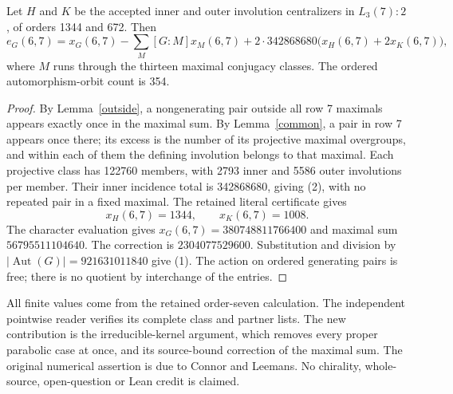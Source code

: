 \documentclass[11pt,a4paper]{article}
\begin{document}
\begin{theorem}
Let $H$ and $K$ be the accepted inner and outer involution centralizers
in $L_3(7):2$, of orders 1344 and 672. Then
\[
 e_G(6,7)=x_G(6,7)-\sum_M[G:M]x_M(6,7)
       +2\cdot342868680\bigl(x_H(6,7)+2x_K(6,7)\bigr),          \tag{2}
\]
where $M$ runs through the thirteen maximal conjugacy classes.
The ordered automorphism-orbit count is 354.
\end{theorem}
\begin{proof}
By Lemma~\ref{outside}, a nongenerating pair outside all row 7
maximals appears exactly once in the maximal sum. By
Lemma~\ref{common}, a pair in row 7 appears once there; its excess
is the number of its projective maximal overgroups, and within
each of them the defining involution belongs to that maximal.
Each projective class has 122760 members, with 2793 inner and
5586 outer involutions per member. Their inner incidence total is
342868680, giving (2), with no repeated pair in a fixed maximal.
The retained literal certificate gives
\[
                        x_H(6,7)=1344,\qquad x_K(6,7)=1008.
\]
The character evaluation gives $x_G(6,7)=380748811766400$ and
maximal sum $56795511104640$. The correction is $2304077529600$.
Substitution and division by $|\operatorname{Aut}(G)|=921631011840$
give (1). The action on ordered generating pairs is free; there
is no quotient by interchange of the entries.
\end{proof}

All finite values come from the retained order-seven calculation.
The independent pointwise reader verifies its complete class and
partner lists. The new contribution is the irreducible-kernel
argument, which removes every proper parabolic case at once,
and its source-bound correction of the maximal sum. The original
numerical assertion is due to Connor and Leemans. No chirality,
whole-source, open-question or Lean credit is claimed.
\end{document}
